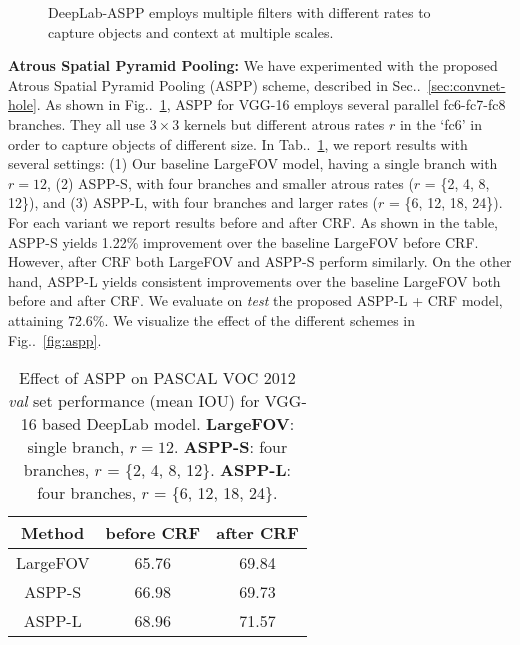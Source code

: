 \documentclass[10pt,journal,compsoc]{IEEEtran}
\makeatletter
\newcommand{\figref}[1]{Fig\onedot~\ref{#1}}
\newcommand{\secref}[1]{Sec\onedot~\ref{#1}}
\newcommand{\tabref}[1]{Tab\onedot~\ref{#1}}
\newcommand{\by}[2]{\ensuremath{#1 \! \times \! #2}}
\def\onedot{\ifx\@let@token.\else.\null\fi\xspace}
\makeatother
\begin{document}
\begin{figure}[!t]
  \centering
  \caption{DeepLab-ASPP employs multiple filters with different rates to capture objects and context at multiple
    scales.}
  \label{fig:diff_hole}
\end{figure}

\textbf{Atrous Spatial Pyramid Pooling:} We have experimented with the proposed
Atrous Spatial Pyramid Pooling (ASPP) scheme, described in
\secref{sec:convnet-hole}. As shown in \figref{fig:diff_hole}, ASPP for VGG-16
employs several parallel fc6-fc7-fc8 branches. They all use \by{3}{3} kernels
but different atrous rates $r$ in the `fc6' in order to capture objects of
different size. In \tabref{tab:vgg_mfov}, we report results with several
settings:
(1) Our baseline LargeFOV model, having a single branch with $r=12$,
(2) ASPP-S, with four branches and smaller atrous rates ($r$ = \{2, 4, 8, 12\}), and
(3) ASPP-L, with four branches and larger rates ($r$ = \{6, 12, 18, 24\}).
For each variant we report results before and after CRF.
As shown in the table, ASPP-S yields 1.22\% improvement over the baseline
LargeFOV before CRF. However, after CRF both LargeFOV and ASPP-S perform similarly.
On the other hand, ASPP-L yields consistent improvements over the baseline LargeFOV
both before and after CRF. We evaluate on \textit{test} the proposed ASPP-L + CRF
model, attaining 72.6\%. We visualize the effect of the different schemes in
\figref{fig:aspp}.

\begin{table}[!t]
  \centering
  \addtolength{\tabcolsep}{0pt}
  \begin{tabular} {c | c c }
    \toprule[0.2em]
    {\bf Method} & {\bf before CRF} & {\bf after CRF} \\
    \toprule[0.2em]
    LargeFOV & 65.76 & 69.84 \\
    ASPP-S   & 66.98 & 69.73 \\
    ASPP-L   & 68.96 & 71.57 \\
    \bottomrule[0.1em]
  \end{tabular}
  \caption{Effect of ASPP on PASCAL VOC 2012 \textit{val} set
    performance (mean IOU) for VGG-16 based DeepLab model.
    {\bf LargeFOV}: single branch, $r = 12$.
    {\bf ASPP-S}: four branches, $r$ = \{2, 4, 8, 12\}.
    {\bf ASPP-L}: four branches, $r$ = \{6, 12, 18, 24\}.}
  \label{tab:vgg_mfov}
\end{table}
\end{document}
